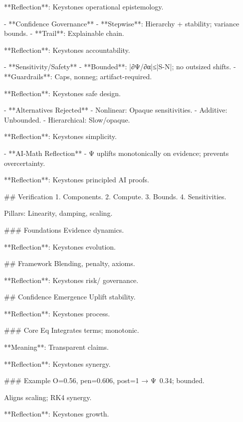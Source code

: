 **Reflection**: Keystones operational epistemology.

- **Confidence Governance**
  - **Stepwise**: Hierarchy + stability; variance bounds.
  - **Trail**: Explainable chain.

**Reflection**: Keystones accountability.

- **Sensitivity/Safety**
  - **Bounded**: |∂Ψ/∂α|≤|S-N|; no outsized shifts.
  - **Guardrails**: Caps, nonneg; artifact-required.

**Reflection**: Keystones safe design.

- **Alternatives Rejected**
  - Nonlinear: Opaque sensitivities.
  - Additive: Unbounded.
  - Hierarchical: Slow/opaque.

**Reflection**: Keystones simplicity.

- **AI-Math Reflection**
  - Ψ uplifts monotonically on evidence; prevents overcertainty.

**Reflection**: Keystones principled AI proofs.

## Verification
1. Components.
2. Compute.
3. Bounds.
4. Sensitivities.

Pillars: Linearity, damping, scaling.

### Foundations
Evidence dynamics.

**Reflection**: Keystones evolution.

## Framework
Blending, penalty, axioms.

**Reflection**: Keystones risk/ governance.

## Confidence Emergence
Uplift stability.

**Reflection**: Keystones process.

### Core Eq
Integrates terms; monotonic.

**Meaning**: Transparent claims.

**Reflection**: Keystones synergy.

### Example
O=0.56, pen=0.606, post=1 → Ψ~0.34; bounded.

Aligns scaling; RK4 synergy.

**Reflection**: Keystones growth.

